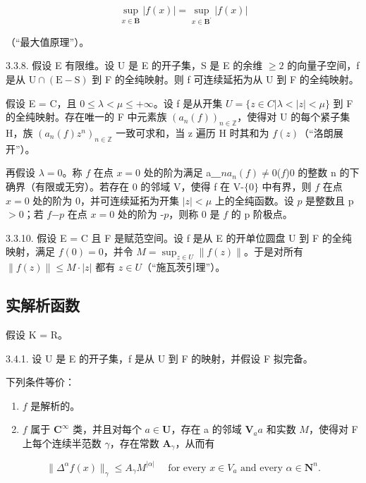 \[
\sup _ {x \in \overline {{\mathbf {B}}}} | f (x) | = \sup _ {x \in \mathbf {B} ^ {\prime}} | f (x) |
\]

（“最大值原理”）。

3.3.8. 假设 E 有限维。设 U 是 E 的开子集，S 是 E 的余维 \(\geqslant2\) 的向量子空间，f 是从 \(\mathrm{U}\cap(\mathrm{E}-\mathrm{S})\) 到 F 的全纯映射。则 f 可连续延拓为从 U 到 F 的全纯映射。

假设 E = C，且 \(0 \leqslant \lambda < \mu \leqslant +\infty\)。设 f 是从开集 \(U = \{z \in C | \lambda < |z| < \mu\}\) 到 F 的全纯映射。存在唯一的 F 中元素族 \((a_{n}(f))_{n \in \mathbb{Z}}\)，使得对 U 的每个紧子集 H，族 \((a_{n}(f)z^{n})_{n \in \mathbb{Z}}\) 一致可求和，当 z 遍历 H 时其和为 \(f(z)\)（“洛朗展开”）。

再假设 \(\lambda=0\)。称 \(f\) 在点 \(x=0\) 处的阶为满足 a＿\(n\)\(a_{n}(f)\neq0\)(\(f\))0 的整数 n 的下确界（有限或无穷）。若存在 0 的邻域 V，使得 f 在 V-\(\{0\}\) 中有界，则 \(f\) 在点 \(x=0\) 处的阶为 0，并可连续延拓为开集 \(|z|<\mu\) 上的全纯函数。设 \(p\) 是整数且 p\(>0\)；若 \(f\)\(-p\) 在点 \(x=0\) 处的阶为 -\(p\)，则称 0 是 \(f\) 的 p 阶极点。

3.3.10. 假设 E = C 且 F 是赋范空间。设 f 是从 E 的开单位圆盘 U 到 F 的全纯映射，满足 \(f(0) = 0\)，并令 \(M = \sup_{z \in U} \|f(z)\|\)。于是对所有 \(\|f(z)\| \leqslant M \cdot |z|\) 都有 \(z \in U\)（“施瓦茨引理”）。

\subsection{实解析函数}

假设 K = R。

3.4.1. 设 U 是 E 的开子集，f 是从 U 到 F 的映射，并假设 F 拟完备。

下列条件等价：

\begin{enumerate}
\def\labelenumi{(\roman{enumi})}
\item
  \(f\) 是解析的。
\item
  \(f\) 属于 \(\mathbf{C}^{\infty}\) 类，并且对每个 \(a\in\mathbf{U} \)，存在 a 的邻域 \(\mathbf{V}_{a}\)\(a\) 和实数 \(M\)，使得对 F 上每个连续半范数 \(\gamma\)，存在常数 \(\mathbf{A}_{\gamma}\)，从而有
\end{enumerate}

\[
\| \Delta^ {\alpha} f (x) \| _ {\gamma} \leqslant A _ {\gamma} M ^ {| \alpha |} \quad \text {   for   every   } x \in V _ {a} \text {   and   every   } \alpha \in \mathbf {N} ^ {n}.
\]

